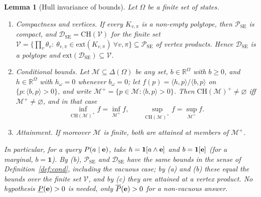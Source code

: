 \documentclass{article} %
\newtheorem{lemma}{Lemma}
\newcommand{\lo}{\underline}
\newcommand{\hi}{\overline}
\newcommand{\DSE}{\mathcal{D}_{\mathrm{SE}}}
\newcommand{\ext}{\mathrm{ext}}
\begin{document}
\begin{lemma}[Hull invariance of bounds]\label{lem:hull}
Let $\Omega$ be a finite set of states.
\begin{enumerate}
  \item[(a)] \emph{Compactness and vertices.} If every $K_{v,\pi}$ is a non-empty
  polytope, then $\mathcal P_{\mathrm{SE}}$ is compact, and
  $\DSE=\mathrm{CH}(\mathcal V)$ for the finite set
  $\mathcal V=\{\prod_v\theta_v:\ \theta_{v,\pi}\in\ext(K_{v,\pi})\ \forall v,\pi\}\subseteq\mathcal P_{\mathrm{SE}}$
  of vertex products. Hence $\DSE$ is a polytope and
  $\ext(\DSE)\subseteq\mathcal V$.
  \item[(b)] \emph{Conditional bounds.} Let $\mathcal M\subseteq\Delta(\Omega)$ be any
  set, $b\in\mathbb R^{\Omega}$ with $b\ge0$, and $h\in\mathbb R^{\Omega}$ with
  $h_\omega=0$ whenever $b_\omega=0$; let $f(p)=\langle h,p\rangle/\langle b,p\rangle$
  on $\{p:\langle b,p\rangle>0\}$, and write $\mathcal M^+=\{p\in\mathcal M:\langle b,p\rangle>0\}$.
  Then $\mathrm{CH}(\mathcal M)^+\neq\varnothing$ iff $\mathcal M^+\neq\varnothing$,
  and in that case
  \[
    \inf_{\mathrm{CH}(\mathcal M)^+}f=\inf_{\mathcal M^+}f,\qquad
    \sup_{\mathrm{CH}(\mathcal M)^+}f=\sup_{\mathcal M^+}f.
  \]
  \item[(c)] \emph{Attainment.} If moreover $\mathcal M$ is finite, both are
  attained at members of $\mathcal M^+$.
\end{enumerate}
In particular, for a query $P(a\mid\mathbf{e})$, take $h=\mathbf 1[a\wedge\mathbf{e}]$ and
$b=\mathbf 1[\mathbf{e}]$ (for a marginal, $b=\mathbf 1$). By (b), $\mathcal P_{\mathrm{SE}}$
and $\DSE$ have the same bounds in the sense of Definition~\ref{def:cond},
including the vacuous case; by (a) and (b) these equal the bounds over the finite
set $\mathcal V$, and by (c) they are attained at a vertex product. No hypothesis
$\lo P(\be)>0$ is needed, only $\hi P(\be)>0$ for a non-vacuous answer.
\end{lemma}
\end{document}
